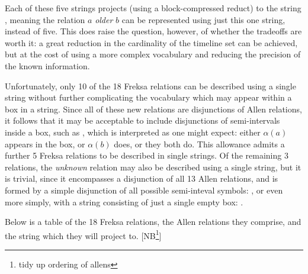 \documentclass[a4paper,12pt,leqno]{article}
\newcommand{\vph}[1]{\vphantom{#1}}
\newcommand{\ebox}[1]{\fbox{$\vph{'(),}#1$}}
\newcommand{\EventString}[1]{
	\renewcommand*{\do}[1]{\ebox{##1}}%
	\PipeParser{#1}
}
\newcommand{\selfnote}[1]{{\color{red}[NB\footnote{{\color{red}#1}}]}}
\newcommand{\nb}{\selfnote}
\begin{document}
Each of these five strings projects (using a block-compressed reduct) to the string \EventString{\alpha(a),\alpha(b)|\alpha(b)|{}}, meaning the relation $a$ \textit{older} $b$ can be represented using just this one string, instead of five. This does raise the question, however, of whether the tradeoffs are worth it: a great reduction in the cardinality of the timeline set can be achieved, but at the cost of using a more complex vocabulary and reducing the precision of the known information.

Unfortunately, only 10 of the 18 Freksa relations can be described using a single string without further complicating the vocabulary which may appear within a box in a string. Since all of these new relations are disjunctions of Allen relations, it follows that it may be acceptable to include disjunctions of semi-intervals inside a box, such as \ebox{\alpha(a) \lor \alpha(b)}, which is interpreted as one might expect: either $\alpha(a)$ appears in the box, or $\alpha(b)$ does, or they both do. This allowance admits a further 5 Freksa relations to be described in single strings. Of the remaining 3 relations, the \textit{unknown} relation may also be described using a single string, but it is trivial, since it encompasses a disjunction of all 13 Allen relations, and is formed by a simple disjunction of all possible semi-inteval symbols: \ebox{\alpha(a) \lor \alpha(b) \lor \omega(a) \lor \omega(b) \lor \epsilon}, or even more simply, with a string consisting of just a single empty box: \ebox{}.

Below is a table of the 18 Freksa relations, the Allen relations they comprise, and the string which they will project to. \nb{tidy up ordering of allens}
\end{document}
